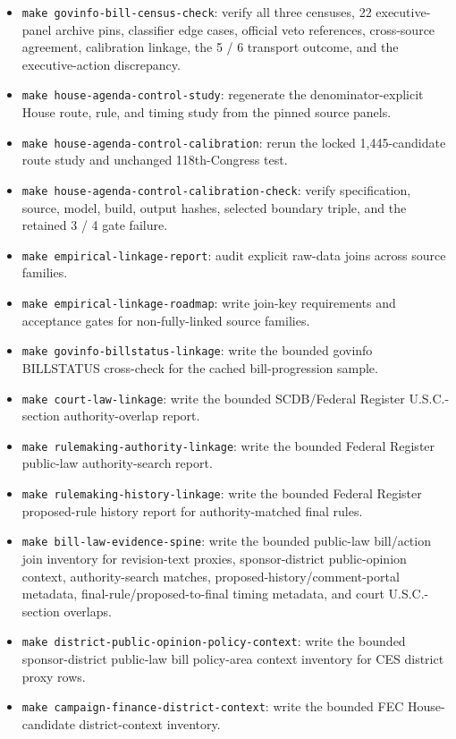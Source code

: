 \documentclass[manuscript]{acmart}
\begin{document}
\begin{itemize}
  \item \texttt{make govinfo-bill-census-check}: verify all three censuses, 22 executive-panel archive pins, classifier edge cases, official veto references, cross-source agreement, calibration linkage, the 5 / 6 transport outcome, and the executive-action discrepancy.
  \item \texttt{make house-agenda-control-study}: regenerate the denominator-explicit House route, rule, and timing study from the pinned source panels.
  \item \texttt{make house-agenda-control-calibration}: rerun the locked 1,445-candidate route study and unchanged 118th-Congress test.
  \item \texttt{make house-agenda-control-calibration-check}: verify specification, source, model, build, output hashes, selected boundary triple, and the retained 3 / 4 gate failure.
  \item \texttt{make empirical-linkage-report}: audit explicit raw-data joins across source families.
  \item \texttt{make empirical-linkage-roadmap}: write join-key requirements and acceptance gates for non-fully-linked source families.
  \item \texttt{make govinfo-billstatus-linkage}: write the bounded govinfo BILLSTATUS cross-check for the cached bill-progression sample.
  \item \texttt{make court-law-linkage}: write the bounded SCDB/Federal Register U.S.C.-section authority-overlap report.
  \item \texttt{make rulemaking-authority-linkage}: write the bounded Federal Register public-law authority-search report.
  \item \texttt{make rulemaking-history-linkage}: write the bounded Federal Register proposed-rule history report for authority-matched final rules.
  \item \texttt{make bill-law-evidence-spine}: write the bounded public-law bill/action join inventory for revision-text proxies, sponsor-district public-opinion context, authority-search matches, proposed-history/comment-portal metadata, final-rule/proposed-to-final timing metadata, and court U.S.C.-section overlaps.
  \item \texttt{make district-public-opinion-policy-context}: write the bounded sponsor-district public-law bill policy-area context inventory for CES district proxy rows.
  \item \texttt{make campaign-finance-district-context}: write the bounded FEC House-candidate district-context inventory.

\end{itemize}
\end{document}
